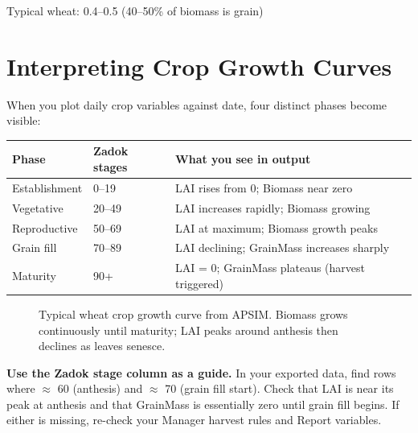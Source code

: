 Typical wheat: 0.4--0.5 (40--50\% of biomass is grain)

\section{Interpreting Crop Growth Curves}

When you plot daily crop variables against date, four distinct phases become visible:

\begin{center}
\begin{tabular}{l|l|l}
\textbf{Phase} & \textbf{Zadok stages} & \textbf{What you see in output} \\
\hline
Establishment & 0--19 & LAI rises from 0; Biomass near zero \\
Vegetative & 20--49 & LAI increases rapidly; Biomass growing \\
Reproductive & 50--69 & LAI at maximum; Biomass growth peaks \\
Grain fill & 70--89 & LAI declining; GrainMass increases sharply \\
Maturity & 90+ & LAI = 0; GrainMass plateaus (harvest triggered) \\
\end{tabular}
\end{center}

\begin{figure}[H]
  \centering
  \caption{Typical wheat crop growth curve from APSIM. Biomass grows continuously until maturity; LAI peaks around anthesis then declines as leaves senesce.}
  \label{fig:growth-curve}
\end{figure}

\begin{keyconceptbox}
\textbf{Use the Zadok stage column as a guide.} In your exported data, find rows where  $\approx$ 60 (anthesis) and  $\approx$ 70 (grain fill start). Check that LAI is near its peak at anthesis and that GrainMass is essentially zero until grain fill begins. If either is missing, re-check your Manager harvest rules and Report variables.
\end{keyconceptbox}

